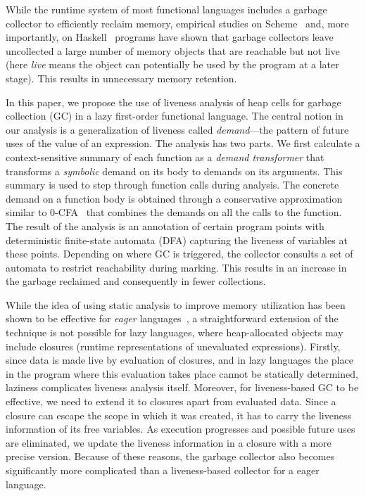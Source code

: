 \documentclass[9pt,preprint,nonatbib]{sigplanconf}
\newcommand{\added}[1]{#1}
\newcommand{\todelete}[1]{}%
\begin{document}
While  the runtime  system  of most  functional  languages includes  a
garbage collector to efficiently  reclaim memory, empirical studies on
Scheme~\cite{karkare06effectiveness}   and,   more   importantly,   on
Haskell~\cite{rojemo96lag} programs have shown that garbage collectors
leave uncollected a large number  of memory objects that are reachable
but not live (here {\em live} means the object can potentially be used
by the program at a  later stage).  This results in unnecessary memory
retention.

In this paper,  we propose the use of liveness  analysis of heap cells
for garbage collection (GC) in a lazy first-order functional language.
The central  notion in  our analysis is  a generalization  of liveness
called {\em  demand}---the pattern of future  uses of the value  of an
expression.   The  analysis  has  two parts.   We  first  calculate  a
context-sensitive  summary   of  each   function  as  a   {\em  demand
  transformer} that transforms a {\em  symbolic} demand on its body to
demands  on its  arguments.   This  summary is  used  to step  through
function calls  during analysis.   The concrete  demand on  a function
body  is  obtained through  a  conservative  approximation similar  to
0-CFA~\cite{Shivers:1988} that  combines the demands on  all the calls
to  the function.   The result  of the  analysis is  an annotation  of
certain program points with  deterministic finite-state automata (DFA)
capturing the  liveness of  variables at  these points.   Depending on
where GC  is triggered, the  collector consults  a set of  automata to
restrict reachability during marking.  This  results in an increase in
the garbage reclaimed and consequently in fewer collections.


\added{While  the idea  of  using static  analysis  to improve  memory
  utilization  has  been  shown  to   be  effective  for  {\em  eager}
  languages~\cite{asati14lgc,       HofmannJ03,       inoue88analysis,
    lee05static}, a straightforward extension  of the technique is not
  possible  for  lazy  languages,  where  heap-allocated  objects  may
  include   closures    (runtime   representations    of   unevaluated
  expressions).   }   \todelete{Designing  a  liveness  based  garbage
  collector   for  lazy   languages  poses   significant  challenges.}
Firstly, since  data is made  live by  evaluation of closures,  and in
lazy languages  the place in  the program where this  evaluation takes
place cannot  be statically determined, laziness  complicates liveness
analysis itself.  Moreover, for liveness-based  GC to be effective, we
need to  extend it  to closures  apart from  evaluated data.   Since a
closure can escape the scope in which  it was created, it has to carry
the  liveness  information  of   its  free  variables.   As  execution
progresses  and possible  future uses  are eliminated,  we update  the
liveness  information  in  a  closure with  a  more  precise  version.
Because  of   these  reasons,  the  garbage   collector  also  becomes
significantly more  complicated than a liveness-based  collector for a
eager language.
\end{document}
